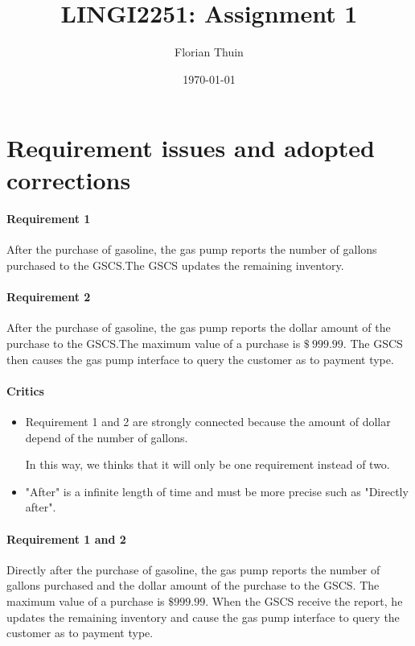 \documentclass[11pt, a4paper]{article}
\title{LINGI2251: Assignment 1}
\author{Florian Thuin}
\date{\today}
\begin{document}
\maketitle
\tableofcontents

\section{Requirement issues and adopted corrections}

\paragraph{Requirement 1} After the purchase of gasoline, the gas pump
reports the number of gallons purchased to the GSCS.\@ The GSCS updates the
remaining inventory.

\paragraph{Requirement 2} After the purchase of gasoline, the gas pump
reports the dollar amount of the purchase to the GSCS.\@ The maximum value of
a purchase is $\$~999.99$. The GSCS then causes the gas pump interface to
query the customer as to payment type.

\begin{framed}
    \paragraph{Critics} 
    \begin{itemize}
        \item Requirement 1 and 2 are strongly connected because the
            amount of dollar depend of the number of gallons.

            In this way, we thinks that it will only be one
            requirement instead of two.

        \item "After" is a infinite length of time and must be more
            precise such as "Directly after".
    \end{itemize}

    \paragraph{Requirement 1 and 2} Directly after the purchase of gasoline,
    the gas pump reports the number of gallons purchased and the
    dollar amount of the purchase to the GSCS. The maximum value of
    a purchase is $\$999.99$. 
    When the GSCS receive the report, he updates the remaining
    inventory and cause the gas pump interface to query the customer as to
    payment type. 

\end{framed}
\end{document}
